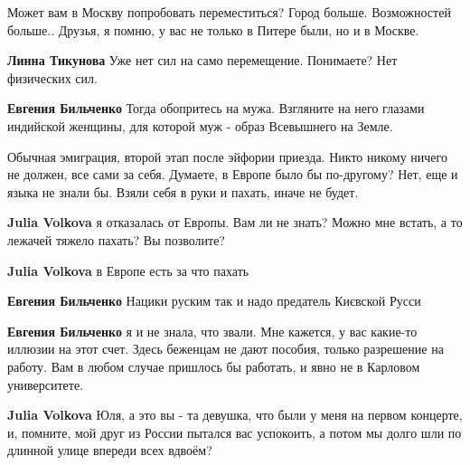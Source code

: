  
 
 
 
 
\zzSecCmt

\begin{itemize} %

Может вам в Москву попробовать переместиться? Город больше. Возможностей
больше.. Друзья, я помню, у вас не только в Питере были, но и в Москве.

\begin{itemize} %
\textbf{Линна Тикунова} Уже нет сил на само перемещение. Понимаете? Нет физических сил.

\textbf{Евгения Бильченко} Тогда обопритесь на мужа. Взгляните на него глазами индийской женщины, для которой муж - образ Всевышнего на Земле.
\end{itemize} %


Обычная эмиграция, второй этап после эйфории приезда. Никто никому ничего не
должен, все сами за себя. Думаете, в Европе было бы по-другому? Нет, еще и
языка не знали бы. Взяли себя в руки и пахать, иначе не будет.

\begin{itemize} %
\textbf{Julia Volkova} я отказалась от Европы. Вам ли не знать? Можно мне встать, а то лежачей тяжело пахать? Вы позволите?

\textbf{Julia Volkova} в Европе есть за что пахать

\textbf{Евгения Бильченко} Нацики руским так и надо предатель Києвской Русси

\textbf{Евгения Бильченко} я и не знала, что звали. Мне кажется, у вас какие-то иллюзии на этот счет. Здесь беженцам не дают пособия, только разрешение на работу. Вам в любом случае пришлось бы работать, и явно не в Карловом университете.

\textbf{Julia Volkova} Юля, а это вы - та девушка, что были у меня на первом концерте, и, помните, мой друг из России пытался вас успокоить, а потом мы долго шли по длинной улице впереди всех вдвоём?


\end{itemize}
\end{itemize}
